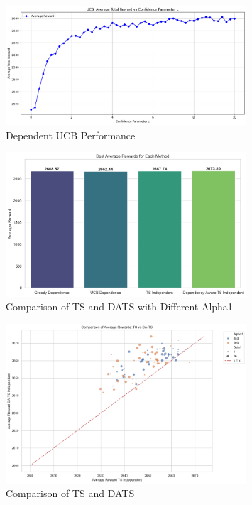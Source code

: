 \documentclass[11pt]{article}
\begin{document}
\begin{figure}[H]
    \centering
    \includegraphics[width=0.8\textwidth]{pics/ucb_dependence.png}
    \caption{Dependent UCB Performance}
    \label{fig:ucb_dependence}
\end{figure}

\begin{figure}[H]
    \centering
    \includegraphics[width=0.8\textwidth]{pics/best_average_rewards.png}    
    \caption{Comparison of TS and DATS with Different Alpha1}
    \label{fig:best_average_rewards}
\end{figure}

\begin{figure}[H]
    \centering
    \includegraphics[width=0.8\textwidth]{pics/comparison_scatter.png}
    \caption{Comparison of TS and DATS}
    \label{fig:comparison_scatter}
\end{figure}
\end{document}
